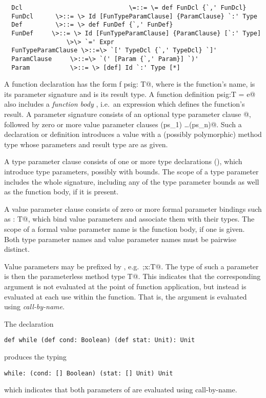 \documentclass[11pt]{report}
\begin{document}
\syntax\begin{verbatim}
  Dcl                             \=::= \= def FunDcl {`,' FunDcl}
  FunDcl      \>::= \> Id [FunTypeParamClause] {ParamClause} `:' Type
  Def         \>::= \> def FunDef {`,' FunDef}
  FunDef     \>::= \> Id [FunTypeParamClause] {ParamClause} [`:' Type] 
                 \>\> `=' Expr
  FunTypeParamClause \>::=\> `[' TypeDcl {`,' TypeDcl} `]'
  ParamClause     \>::=\> `(' [Param {`,' Param}] `)'
  Param        	  \>::= \> [def] Id `:' Type [*]
\end{verbatim}

A function declaration has the form \verb@def f psig: T@, where
\verb@f@ is the function's name, \verb@psig@ is its parameter
signature and \verb@T@ is its result type. A function definition
\verb@f psig:T = e@ also includes a {\em function body} \verb@e@,
i.e.\ an expression which defines the function's result.  A parameter
signature consists of an optional type parameter clause \verb@[tps]@,
followed by zero or more value parameter clauses
\verb@(ps_1) \ldots (ps_n)@.  Such a declaration or definition
introduces a value with a (possibly polymorphic) method type whose
parameters and result type are as given.

A type parameter clause \verb@tps@ consists of one or more type
declarations (), which introduce type parameters,
possibly with bounds.  The scope of a type parameter \verb@a@ includes
the whole signature, including any of the type parameter bounds as
well as the function body, if it is present.  

A value parameter clause \verb@ps@ consists of zero or more formal
parameter bindings such as \verb@x: T@, which bind value
parameters and associate them with their types.  The scope of a formal
value parameter name \verb@x@ is the function body, if one is
given. Both type parameter names and value parameter names must be
pairwise distinct.

Value parameters may be prefixed by \verb@def@, e.g.\
\verb@\DEF;x:T@. The type of such a parameter is then the
parameterless method type \verb@[]T@. This indicates that the
corresponding argument is not evaluated at the point of function
application, but instead is evaluated at each use within the
function. That is, the argument is evaluated using {\em call-by-name}.

\example The declaration
\begin{verbatim}
def while (def cond: Boolean) (def stat: Unit): Unit
\end{verbatim}
produces the typing
\begin{verbatim}
while: (cond: [] Boolean) (stat: [] Unit) Unit
\end{verbatim}
which indicates that both parameters of \verb@while@ are evaluated using
call-by-name.
\end{document}
